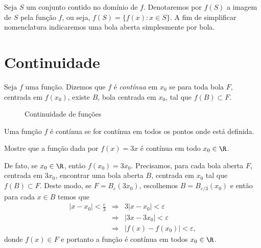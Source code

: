 \documentclass[11pt, oneside, a4paper]{gsm-l}
\begin{document}
Seja $S$ um conjunto contido no domínio de $f$. Denotaremos por $f(S)$ a
imagem de $S$ pela função $f$, ou seja, $f(S)=\big\{f(x): x\in
S\big\}$. A fim de simplificar nomenclatura indicaremos uma bola aberta
simplesmente por bola.

\section{Continuidade}\label{revcalc:cont}
\begin{defi}
  Seja $f$ uma função. Dizemos que $f$ é
  \emph{contínua} em $x_0$ se para toda bola $F$,
  centrada em $f(x_0)$, existe $B$, bola centrada em $x_0$, tal que
  $f(B)\subset F$.
\end{defi}

\begin{figure}[!h]
  \centering
  \caption{Continuidade de funções}
\end{figure}

\begin{defi}
  Uma função $f$ é contínua se for contínua em todos os pontos onde está
  definida.
\end{defi}

\begin{exem}
  Mostre que a função dada por $f(x) = 3x$ é contínua em todo
  $x_0\in\R$.

  De fato, se $x_0\in\R$, então $f(x_0)=3x_0$. Precisamos, para cada
  bola aberta $F$, centrada em $3x_0$, encontrar uma bola aberta $B$,
  centrada em $x_0$ tal que $f(B)\subset F$. Deste modo, se
  $F=B_\varepsilon(3x_0)$, escolhemos $B=B_{\varepsilon\slash 3}(x_0)$ e
  então para cada $x\in B$ temos que
  \begin{eqnarray*}
    |x-x_0|<\frac{\varepsilon}{3}&\Rightarrow&3|x-x_0|<\varepsilon\\
    &\Rightarrow&|3x-3x_0|<\varepsilon\\
    &\Rightarrow&|f(x)-f(x_0)|<\varepsilon,
  \end{eqnarray*}
  donde $f(x)\in F$ e portanto a função é contínua em todos $x_0\in\R$.
\end{exem}
\end{document}
